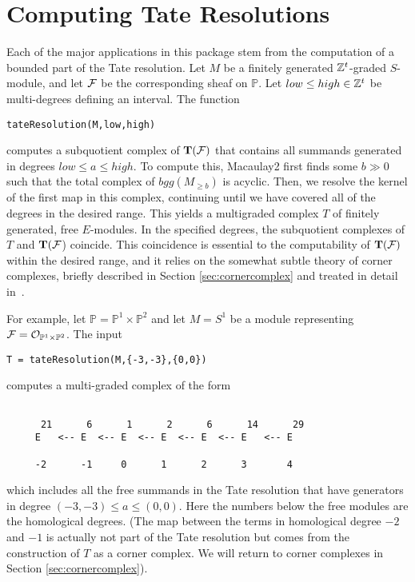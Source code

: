 \documentclass[twoside,12pt, leqno]{amsart}
\def\PP{{\mathbb P}}
\def\bT{{\bf T}}
\begin{document}
\section{Computing Tate Resolutions}\label{sec:tate resolutions}
Each of the major applications in this package stem from the computation of a bounded part of the Tate resolution.
Let $M$ be a finitely generated ${\mathbb Z}^t$-graded $S$-module, and let ${\mathcal F}$ be the 
corresponding sheaf on $\PP$. Let
$low\leq high\in {\mathbb Z}^t$ be multi-degrees defining an interval.  The function
\begin{verbatim}
tateResolution(M,low,high)
\end{verbatim}
computes a subquotient complex of $\bT(\sF)$ that contains all summands generated in degrees $low\leq a \leq  high$.  To compute this, Macaulay2 first finds some $b\gg 0$ such that the total complex of $bgg(M_{\geq b})$ is acyclic.  	Then, we resolve the kernel of  the first map in this complex, continuing until we have covered all of the degrees in the desired range.  This yields a multigraded complex $T$ of finitely generated, free $E$-modules.  In the specified degrees, the subquotient complexes of $T$ and $\bT(\sF$) coincide.  This coincidence is essential to the computability of $\bT(\sF)$ within the desired range, and it relies on the somewhat subtle theory of corner complexes, briefly described in Section \ref{sec:cornercomplex} and treated in detail in~\cite{EES}.

For example, let $\PP=\PP^1\times \PP^2$ and let $M=S^1$ be a module representing $\sF=\cO_{\PP^1\times \PP^2}$.  The input
\begin{verbatim}
T = tateResolution(M,{-3,-3},{0,0})
\end{verbatim}
computes a multi-graded complex of the form
{\small \begin{verbatim}

      21      6      1      2      6      14      29
     E   <-- E  <-- E  <-- E  <-- E  <-- E   <-- E
                                                      
     -2      -1     0      1      2      3       4
\end{verbatim}}
\noindent which includes all the free summands in the Tate resolution that have generators in degree $(-3,-3)\leq a\leq (0,0)$. Here the numbers below the free modules are the homological degrees. (The map between the terms in homological degree $-2$ and $-1$ is actually not part of the Tate resolution but  comes from the construction of $T$ as a corner complex. We will return to corner complexes in Section \ref{sec:cornercomplex}). 
\end{document}
